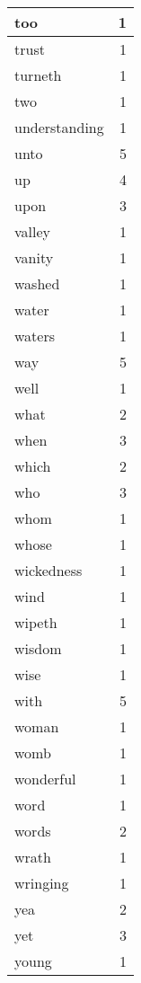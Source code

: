 \begin{center}
\begin{longtable}{l|r}
too & 1\\ \hline 
trust & 1\\ \hline 
turneth & 1\\ \hline 
two & 1\\ \hline 
understanding & 1\\ \hline 
unto & 5\\ \hline 
up & 4\\ \hline 
upon & 3\\ \hline 
valley & 1\\ \hline 
vanity & 1\\ \hline 
washed & 1\\ \hline 
water & 1\\ \hline 
waters & 1\\ \hline 
way & 5\\ \hline 
well & 1\\ \hline 
what & 2\\ \hline 
when & 3\\ \hline 
which & 2\\ \hline 
who & 3\\ \hline 
whom & 1\\ \hline 
whose & 1\\ \hline 
wickedness & 1\\ \hline 
wind & 1\\ \hline 
wipeth & 1\\ \hline 
wisdom & 1\\ \hline 
wise & 1\\ \hline 
with & 5\\ \hline 
woman & 1\\ \hline 
womb & 1\\ \hline 
wonderful & 1\\ \hline 
word & 1\\ \hline 
words & 2\\ \hline 
wrath & 1\\ \hline 
wringing & 1\\ \hline 
yea & 2\\ \hline 
yet & 3\\ \hline 
young & 1\\ \hline 
\end{longtable}  
\end{center}  


  
\normalsize  

  
  
